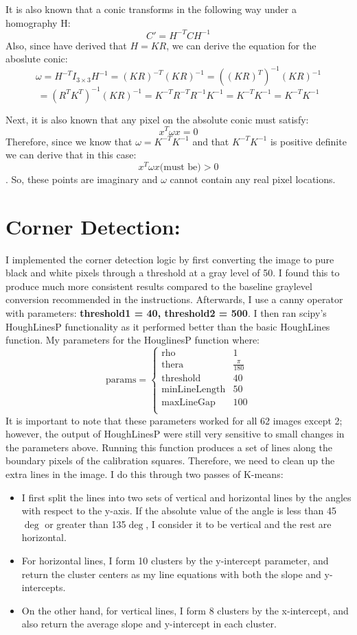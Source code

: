 \documentclass{article}
\begin{document}
It is also known that a conic transforms in the following way under a homography H: 
\[C\prime = H^{-T}CH^{-1}\]
Also, since have derived that $H=KR$, we can derive the equation for the aboslute conic:
\[\omega = H^{-T} I_{3 \times 3} H^{-1} = (KR)^{-T} (KR)^{-1} = ((KR)^T)^{-1} (KR)^{-1}\]
\[= (R^T K^T)^{-1} (KR)^{-1} = K^{-T} R^{-T} R^{-1} K^{-1} = K^{-T} K^{-1} = K^{-T} K^{-1}\]


Next, it is also known that any pixel on the absolute conic must satisfy:
\[x^T \omega x = 0\]
Therefore, since we know that \(\omega = K^{-T}K^{-1}\) and that $K^{-T}K^{-1}$ is positive definite we can derive that in this case: \[x^T \omega x \text{(must be)}> 0\]. So, these points are imaginary and $\omega$ cannot contain any real pixel locations.


\section{Corner Detection:}
I implemented the corner detection logic by first converting the image to pure black and white pixels through a threshold at a gray level of 50. I found this to produce much more consistent results compared to the baseline graylevel conversion recommended in the instructions. Afterwards, I use a canny operator with parameters: \textbf{threshold1 = 40, threshold2 = 500}. I then ran scipy's HoughLinesP functionality as it performed better than the basic HoughLines function. My parameters for the HouglinesP function where:
\[ \text{params} = 
    \begin{cases}
        \text{rho} & 1 \\
        \text{thera} & \frac{\pi}{180} \\
        \text{threshold} & 40 \\
        \text{minLineLength} & 50 \\
        \text{maxLineGap} & 100 \\
    \end{cases}
\]
It is important to note that these parameters worked for all 62 images except 2; however, the output of HoughLinesP were still very sensitive to small changes in the parameters above. Running this function produces a set of lines along the boundary pixels of the calibration squares. Therefore, we need to clean up the extra lines in the image. I do this through two passes of K-means:
\begin{itemize}
    \item I first split the lines into two sets of vertical and horizontal lines by the angles with respect to the y-axis. If the absolute value of the angle is less than 45$\deg$ or greater than 135$\deg$, I consider it to be vertical and the rest are horizontal.
    \item For horizontal lines, I form 10 clusters by the y-intercept parameter, and return the cluster centers as my line equations with both the slope and y-intercepts.
    \item On the other hand, for vertical lines, I form 8 clusters by the x-intercept, and also return the average slope and y-intercept in each cluster.
\end{itemize}
\end{document}
